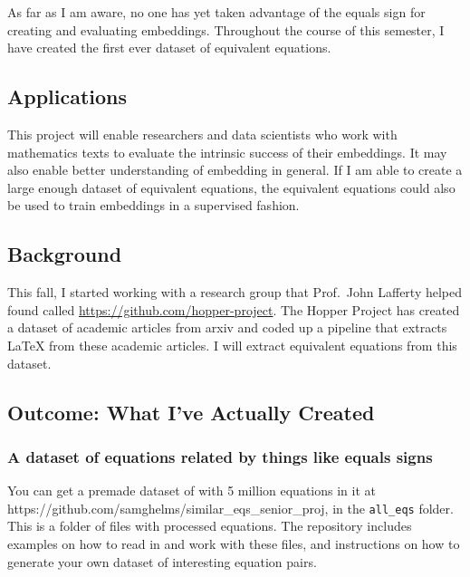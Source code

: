 \documentclass[]{article}
\begin{document}
As far as I am aware, no one has yet taken advantage of the equals sign
for creating and evaluating embeddings. Throughout the course of this
semester, I have created the first ever dataset of equivalent equations.

\hypertarget{applications}{%
\subsection{Applications}\label{applications}}

This project will enable researchers and data scientists who work with
mathematics texts to evaluate the intrinsic success of their embeddings.
It may also enable better understanding of embedding in general. If I am
able to create a large enough dataset of equivalent equations, the
equivalent equations could also be used to train embeddings in a
supervised fashion.

\hypertarget{background}{%
\subsection{Background}\label{background}}

This fall, I started working with a research group that Prof.~John
Lafferty helped found called
\href{The\%20Hopper\%20Project}{https://github.com/hopper-project}. The
Hopper Project has created a dataset of academic articles from arxiv and
coded up a pipeline that extracts LaTeX from these academic articles. I
will extract equivalent equations from this dataset.

\hypertarget{outcome-what-ive-actually-created}{%
\subsection{Outcome: What I've Actually
Created}\label{outcome-what-ive-actually-created}}

\hypertarget{a-dataset-of-equations-related-by-things-like-equals-signs}{%
\subsubsection{A dataset of equations related by things like equals
signs}\label{a-dataset-of-equations-related-by-things-like-equals-signs}}

You can get a premade dataset of with 5 million equations in it at
https://github.com/samghelms/similar\_eqs\_senior\_proj, in the
\texttt{all\_eqs} folder. This is a folder of files with processed
equations. The repository includes examples on how to read in and work
with these files, and instructions on how to generate your own dataset
of interesting equation pairs.
\end{document}
